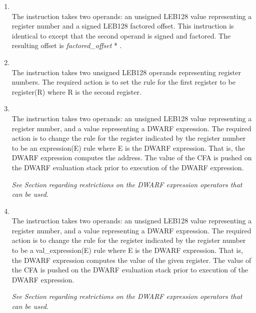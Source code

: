 \begin{enumerate}[1. ]
\item \textbf{\DWCFAvaloffsetsfTARG} \\
The \DWCFAvaloffsetsfNAME{} instruction takes two operands: an
unsigned LEB128 value representing a register number and a
signed LEB128 factored offset. This instruction is identical
to \DWCFAvaloffset{} except that the second operand is signed
and factored. The resulting offset is 
\textit{factored\_offset} * .

\item \textbf{\DWCFAregisterTARG} \\
The \DWCFAregisterNAME{} 
instruction takes two unsigned LEB128
operands representing register numbers. The required action
is to set the rule for the first register to be register(R)
where R is the second register.

\item \textbf{\DWCFAexpressionTARG} \\
The \DWCFAexpressionNAME{} instruction takes two operands: an
unsigned LEB128 
value representing a register number, and
a \DWFORMblock{} 
value representing a DWARF expression. 
The
required action is to change the rule for the register
indicated by the register number to be an expression(E)
rule where E is the DWARF expression. That is, the DWARF
expression computes the address. The value of the CFA is
pushed on the DWARF evaluation stack prior to execution of
the DWARF expression.

\textit{See Section  
regarding restrictions on the DWARF
expression operators that can be used.}

\item \textbf{\DWCFAvalexpressionTARG} \\
The \DWCFAvalexpressionNAME{} instruction takes two operands:
an unsigned LEB128 
value representing a register number, and
a \DWFORMblock{} 
value representing a DWARF expression. The
required action is to change the rule for the register
indicated by the register number to be a val\_expression(E)
rule where E is the DWARF expression. That is, the DWARF
expression computes the value of the given register. The value
of the CFA is pushed on the DWARF evaluation stack prior to
execution of the DWARF expression.

\textit{See Section  
regarding restrictions on the DWARF
expression operators that can be used.}


\end{enumerate}
